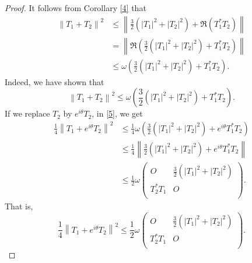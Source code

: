 \documentclass[10pt,a4paper]{amsart}
\begin{document}
\begin{proof}
It follows from Corollary \ref{4} that
	\[\begin{aligned}
   {{\left\| {{T}_{1}}+{{T}_{2}} \right\|}^{2}}&\le \left\| \frac{3}{2}\left( {{\left| {{T}_{1}} \right|}^{2}}+{{\left| {{T}_{2}} \right|}^{2}} \right)+\Re\left( T_{1}^{*}{{T}_{2}} \right) \right\| \\ 
 & =\left\| \Re\left( \frac{3}{2}\left( {{\left| {{T}_{1}} \right|}^{2}}+{{\left| {{T}_{2}} \right|}^{2}} \right)+T_{1}^{*}{{T}_{2}} \right) \right\| \\ 
 & \le \omega \left( \frac{3}{2}\left( {{\left| {{T}_{1}} \right|}^{2}}+{{\left| {{T}_{2}} \right|}^{2}} \right)+T_{1}^{*}{{T}_{2}} \right).  
\end{aligned}\]
Indeed, we have shown that
\begin{equation}\label{5}
{{\left\| {{T}_{1}}+{{T}_{2}} \right\|}^{2}}\le \omega \left( \frac{3}{2}\left( {{\left| {{T}_{1}} \right|}^{2}}+{{\left| {{T}_{2}} \right|}^{2}} \right)+T_{1}^{*}{{T}_{2}} \right).
\end{equation}
If we replace ${{T}_{2}}$ by ${{e}^{i\theta }}{{T}_{2}}$, in \eqref{5}, we get
	\[\begin{aligned}
   \frac{1}{4}{{\left\| {{T}_{1}}+{{e}^{i\theta }}{{T}_{2}} \right\|}^{2}}&\le \frac{1}{4}\omega \left( \frac{3}{2}\left( {{\left| {{T}_{1}} \right|}^{2}}+{{\left| {{T}_{2}} \right|}^{2}} \right)+{{e}^{i\theta }}T_{1}^{*}{{T}_{2}} \right) \\ 
 & \le \frac{1}{4}\left\| \frac{3}{2}\left( {{\left| {{T}_{1}} \right|}^{2}}+{{\left| {{T}_{2}} \right|}^{2}} \right)+{{e}^{i\theta }}T_{1}^{*}{{T}_{2}} \right\| \\ 
 & \le \frac{1}{2}\omega \left( \begin{matrix}
   O & \frac{3}{2}\left( {{\left| {{T}_{1}} \right|}^{2}}+{{\left| {{T}_{2}} \right|}^{2}} \right)  \\
   T_{2}^{*}{{T}_{1}} & O  \\
\end{matrix} \right).  
\end{aligned}\]
That is,
	\[\frac{1}{4}{{\left\| {{T}_{1}}+{{e}^{i\theta }}{{T}_{2}} \right\|}^{2}}\le \frac{1}{2}\omega \left( \begin{matrix}
   O & \frac{3}{2}\left( {{\left| {{T}_{1}} \right|}^{2}}+{{\left| {{T}_{2}} \right|}^{2}} \right)  \\
   T_{2}^{*}{{T}_{1}} & O  \\
\end{matrix} \right).\]

\end{proof}
\end{document}
